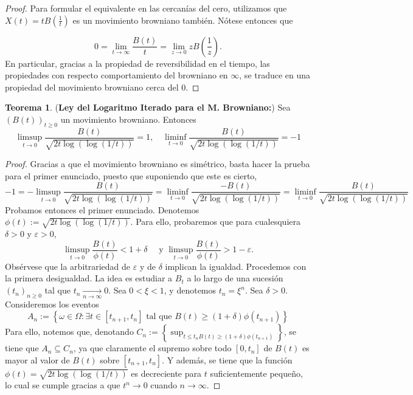 \documentclass[letterpaper]{article}
\renewcommand{\to}{\rightarrow}
\newcommand{\1}{\mathds{1}}
\theoremstyle{definition}
\theoremstyle{definition}
\newtheorem{teo}{Teorema}
\theoremstyle{definition}
\theoremstyle{definition}
\theoremstyle{definition}
\begin{document}
\begin{enumerate}
\begin{proof}
        Para formular el equivalente en las cercanías del cero, utilizamos que $X(t)=tB(\frac{1}{t})$
        es un movimiento browniano también. Nótese entonces que
        
        \[
        0=\lim_{t\to \infty}\frac{B(t)}{t}=\lim_{z\to 0}zB\left(\frac{1}{z}\right).
        \]
        En particular, gracias a la propiedad de reversibilidad en el tiempo, las propiedades 
        con respecto comportamiento del browniano en $\infty$, se traduce en una propiedad
        del movimiento browniano cerca del 0. 
     \end{proof}
     \begin{teo}(\textbf{Ley del Logaritmo Iterado para el M. Browniano:})
      Sea $(B(t))_{t\geq0}$ un movimiento browniano. Entonces 
      \[
      \limsup_{t\to 0}\frac{B(t)}{\sqrt{2t\log(\log(1/t))}}=1, \quad  \liminf_{t\to 0}\frac{B(t)}{\sqrt{2t\log(\log(1/t))}}=-1
      \]
    \end{teo}
    \begin{proof} 
      Gracias a que el movimiento browniano es simétrico, basta hacer la prueba para el primer
      enunciado, puesto que suponiendo que este es cierto,
      \[
        -1=-\limsup_{t\to 0}\frac{B(t)}{\sqrt{2t\log(\log(1/t))}}=\liminf_{t\to 0}\frac{-B(t)}{\sqrt{2t\log(\log(1/t))}}=\liminf_{t\to 0}\frac{B(t)}{\sqrt{2t\log(\log(1/t))}}
      \]
      Probamos entonces el primer enunciado. Denotemos $\phi(t):=\sqrt{2t\log(\log(1/t))}$. Para ello, probaremos que para cualesquiera $\delta>0$ y $\varepsilon>0$,
      \[
        \limsup_{t\to 0}\frac{B(t)}{\phi(t)}<1+\delta \quad \text{ y } \limsup_{t\to 0}\frac{B(t)}{\phi(t)}>1-\varepsilon.
      \]
      Obsérvese que la arbitrariedad de $\varepsilon$ y de $\delta$ implican la igualdad. Procedemos con la primera
      desigualdad. La idea es estudiar a $B_t$ a lo largo de una sucesión $(t_n)_{n\geq0}$ tal que $t_n\xrightarrow[n\to \infty]{}0$.
      Sea $0<\xi<1$, y denotemos $t_n=\xi^n$. Sea $\delta>0$. Consideremos los eventos
      \[
        A_n:=\left\{\omega \in \Omega: \exists t\in [t_{n+1},t_n] \text{ tal que } B(t)\geq (1+\delta)\phi(t_{n+1})\right\}
      \]
      Para ello, notemos que, denotando $C_n:=\left\{\sup_{t\leq t_n B(t)\geq (1+\delta)\phi(t_{n+1})}\right\}$, se tiene que
      $A_n\subseteq C_n$, ya que claramente el supremo sobre todo $[0,t_n]$ de $B(t)$ es mayor al valor de $B(t)$ sobre $[t_{n+1},t_n]$. Y además, 
      se tiene que la función $\phi(t)=\sqrt{2t\log(\log(1/t))}$ es decreciente para $t$ suficientemente pequeño, lo cual se cumple 
      gracias a que $t^n\to 0$ cuando $n\to \infty$.
      \newline
      

\end{proof}
\end{enumerate}
\end{document}
